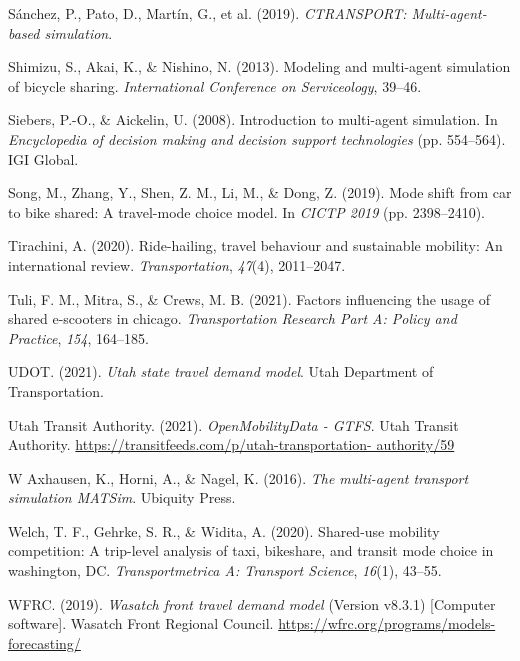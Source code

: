 \documentclass[simple, masters, twoside]{byuthesis}
\newlength{\cslhangindent}
\newlength{\cslentryspacingunit} %
\newenvironment{CSLReferences}[2] %
 {%
  \setlength{\parindent}{0pt}
  \ifodd #1
  \let\oldpar\par
  \def\par{\hangindent=\cslhangindent\oldpar}
  \fi
  \setlength{\parskip}{#2\cslentryspacingunit}
 }%
 {}
\begin{document}
\begin{CSLReferences}{1}{0}
\leavevmode{}%
Sánchez, P., Pato, D., Martín, G., et al. (2019). \emph{CTRANSPORT: Multi-agent-based simulation}.

\leavevmode{}%
Shimizu, S., Akai, K., \& Nishino, N. (2013). Modeling and multi-agent simulation of bicycle sharing. \emph{International Conference on Serviceology}, 39--46.

\leavevmode{}%
Siebers, P.-O., \& Aickelin, U. (2008). Introduction to multi-agent simulation. In \emph{Encyclopedia of decision making and decision support technologies} (pp. 554--564). IGI Global.

\leavevmode{}%
Song, M., Zhang, Y., Shen, Z. M., Li, M., \& Dong, Z. (2019). Mode shift from car to bike shared: A travel-mode choice model. In \emph{CICTP 2019} (pp. 2398--2410).

\leavevmode{}%
Tirachini, A. (2020). Ride-hailing, travel behaviour and sustainable mobility: An international review. \emph{Transportation}, \emph{47}(4), 2011--2047.

\leavevmode{}%
Tuli, F. M., Mitra, S., \& Crews, M. B. (2021). Factors influencing the usage of shared e-scooters in chicago. \emph{Transportation Research Part A: Policy and Practice}, \emph{154}, 164--185.

\leavevmode{}%
UDOT. (2021). \emph{Utah state travel demand model}. Utah Department of Transportation.

\leavevmode{}%
Utah Transit Authority. (2021). \emph{OpenMobilityData - GTFS}. Utah Transit Authority. \href{https://transitfeeds.com/p/utah-transportation-\%20authority/59}{https://transitfeeds.com/p/utah-transportation- authority/59}

\leavevmode{}%
W Axhausen, K., Horni, A., \& Nagel, K. (2016). \emph{The multi-agent transport simulation MATSim}. Ubiquity Press.

\leavevmode{}%
Welch, T. F., Gehrke, S. R., \& Widita, A. (2020). Shared-use mobility competition: A trip-level analysis of taxi, bikeshare, and transit mode choice in washington, DC. \emph{Transportmetrica A: Transport Science}, \emph{16}(1), 43--55.

\leavevmode{}%
WFRC. (2019). \emph{Wasatch front travel demand model} (Version v8.3.1) {[}Computer software{]}. Wasatch Front Regional Council. \url{https://wfrc.org/programs/models-forecasting/}


\end{CSLReferences}
\end{document}
